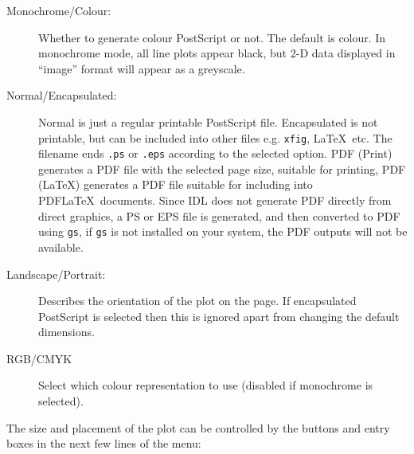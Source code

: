 \documentclass[11pt,twoside,english]{article}
\begin{document}
 \begin{description}
 \item [Monochrome/Colour:]Whether to generate colour PostScript or
   not.  The default is colour. In monochrome mode, all line plots
   appear black, but 2-D data displayed in {}``image'' format will
   appear as a greyscale.
 \item [Normal/Encapsulated:]Normal is just a regular printable
   PostScript file. Encapsulated is not printable, but can be included
   into other files e.g. \texttt{xfig}, \LaTeX\ etc. The filename ends
   \texttt{.ps} or \texttt{.eps} according to the selected option. PDF
   (Print) generates a PDF file with the selected page size, suitable
   for printing, PDF (LaTeX) generates a PDF file suitable for
   including into PDF\LaTeX\ documents. Since IDL does not generate PDF
   directly from direct graphics, a PS or EPS file is generated, and
   then converted to PDF using \texttt{gs}, if \texttt{gs} is not
   installed on your system, the PDF outputs will not be available.
 \item [Landscape/Portrait:]Describes the orientation of the plot on
   the page. If encapsulated PostScript is selected then this is
   ignored apart from changing the default dimensions.
 \item[RGB/CMYK] Select which colour representation to use (disabled if
   monochrome is selected).
 \end{description}
 The size and placement of the plot can be controlled by the buttons
 and entry boxes in the next few lines of the menu:
\end{document}
